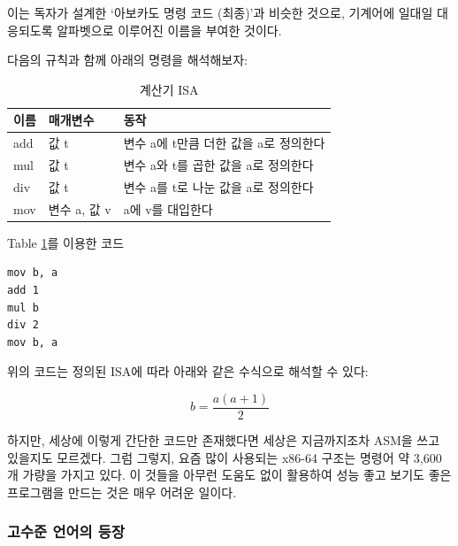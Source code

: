 \documentclass{article}
\begin{document}
이는 독자가 설계한 `아보카도 명령 코드 (최종)'과 비슷한 것으로,
기계어에 일대일 대응되도록 알파벳으로 이루어진 이름을 부여한 것이다.

다음의 규칙과 함께 아래의 명령을 해석해보자:

\begin{table}[!h]
    \centering

    \caption{계산기 ISA}
    \label{Tab:simple-calculator-isa}

    \begin{tabular}{ || m{2em} | m{5em} | m{22em} || }
        \hline
        이름 & 매개변수 & 동작 \\
        \hline\hline
        add  & 값 t & 변수 a에 t만큼 더한 값을 a로 정의한다 \\
        \hline
        mul  & 값 t & 변수 a와 t를 곱한 값을 a로 정의한다 \\
        \hline
        div  & 값 t & 변수 a를 t로 나눈 값을 a로 정의한다 \\
        \hline
        mov  & 변수 a, 값 v & a에 v를 대입한다 \\
        \hline
    \end{tabular}
\end{table}

\begin{center}

    \centering
    
    Table \ref{Tab:simple-calculator-isa}를 이용한 코드

\begin{lstlisting}[escapeinside=``]
mov b, a
add 1
mul b
div 2
mov b, a
\end{lstlisting}
\end{center}

위의 코드는 정의된 ISA에 따라 아래와 같은 수식으로 해석할 수 있다:

\begin{equation}
b = \frac{a(a + 1)}{2}
\end{equation}

하지만, 세상에 이렇게 간단한 코드만 존재했다면 세상은 지금까지조차 ASM을
쓰고 있을지도 모르겠다.
그럼 그렇지, 요즘 많이 사용되는 x86-64 구조는 명령어 약 3,600개 가량을
가지고 있다.
이 것들을 아무런 도움도 없이 활용하여 성능 좋고 보기도 좋은 프로그램을
만드는 것은 매우 어려운 일이다.

\subsubsection{고수준 언어의 등장}
\end{document}
